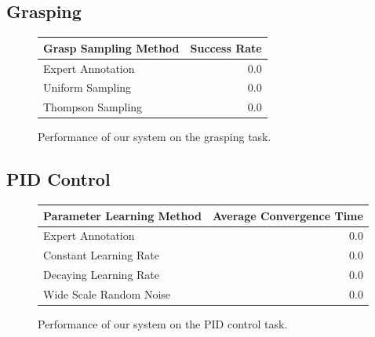 \documentclass[conference]{IEEEtran}
\begin{document}
\subsection{Grasping}

\begin{figure}
  \begin{center}
  \begin{tabular}{lr}
  \toprule
  Grasp Sampling Method & Success Rate \\ 
  \midrule
  Expert Annotation & 0.0 \\ 
  Uniform Sampling & 0.0 \\ 
  Thompson Sampling & 0.0 \\
  \bottomrule
  \end{tabular}
  \caption{Performance of our system on the grasping task.}
  \end{center}
\end{figure}

\subsection{PID Control}

\begin{figure}
  \begin{center}
  \begin{tabular}{lr}
    \toprule
  Parameter Learning Method & Average Convergence Time \\ 
  \midrule
  Expert Annotation & 0.0 \\ 
  Constant Learning Rate & 0.0 \\
  Decaying Learning Rate & 0.0 \\
  Wide Scale Random Noise & 0.0 \\
  \bottomrule
  \end{tabular}
  \caption{Performance of our system on the PID control task.}
  \end{center}
\end{figure}


\end{document}
